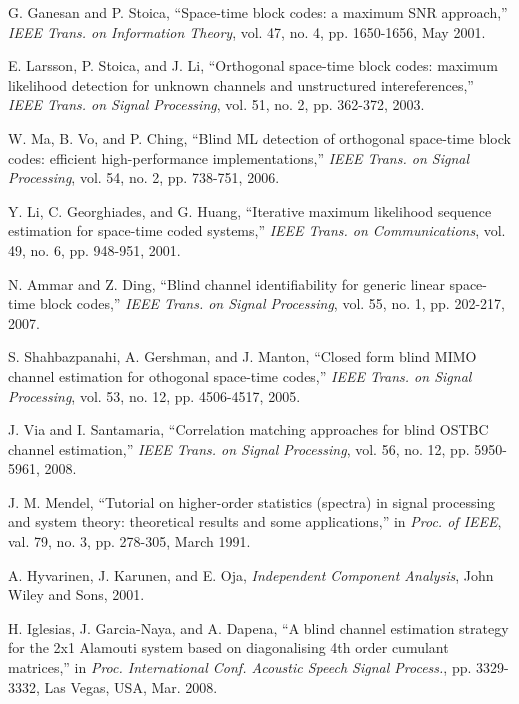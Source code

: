 \documentclass[letterpaper,10pt]{article}
\begin{document}
\pagebreak

\begin{thebibliography}{1}
    \setlength{\parskip}{2pt} %

   G. Ganesan and P. Stoica, ``Space-time block codes: a maximum SNR approach,'' \emph{IEEE Trans. on Information Theory}, vol. 47, no. 4, pp. 1650-1656, May 2001.

   E. Larsson, P. Stoica, and J. Li, ``Orthogonal space-time block codes: maximum likelihood detection for unknown channels and unstructured intereferences,'' \emph{IEEE Trans. on Signal Processing}, vol. 51, no. 2, pp. 362-372, 2003.

   W. Ma, B. Vo, and P. Ching, ``Blind ML detection of orthogonal space-time block codes: efficient high-performance implementations,'' \emph{IEEE Trans. on Signal Processing}, vol. 54, no. 2, pp. 738-751, 2006.

   Y. Li, C. Georghiades, and G. Huang, ``Iterative maximum likelihood sequence estimation for space-time coded systems,'' \emph{IEEE Trans. on Communications}, vol. 49, no. 6, pp. 948-951, 2001.

   N. Ammar and Z. Ding, ``Blind channel identifiability for generic linear space-time block codes,'' \emph{IEEE Trans. on Signal Processing}, vol. 55, no. 1, pp. 202-217, 2007.

   S. Shahbazpanahi, A. Gershman, and J. Manton, ``Closed form blind MIMO channel estimation for othogonal space-time codes,'' \emph{IEEE Trans. on Signal Processing}, vol. 53, no. 12, pp. 4506-4517, 2005.

   J. Via and I. Santamaria, ``Correlation matching approaches for blind OSTBC channel estimation,'' \emph{IEEE Trans. on Signal Processing}, vol. 56, no. 12, pp. 5950-5961, 2008.

   J. M. Mendel, ``Tutorial on higher-order statistics (spectra) in signal processing and system theory: theoretical results and some applications,'' in \emph{Proc. of IEEE}, val. 79, no. 3, pp. 278-305, March 1991.

   A. Hyvarinen, J. Karunen, and E. Oja, \emph{Independent Component Analysis}, John Wiley and Sons, 2001.

   H. Iglesias, J. Garcia-Naya, and A. Dapena, ``A blind channel estimation strategy for the 2x1 Alamouti system based on diagonalising 4th order cumulant matrices,'' in \emph{Proc. International Conf. Acoustic Speech Signal Process.}, pp. 3329-3332, Las Vegas, USA, Mar. 2008.


\end{thebibliography}
\end{document}
